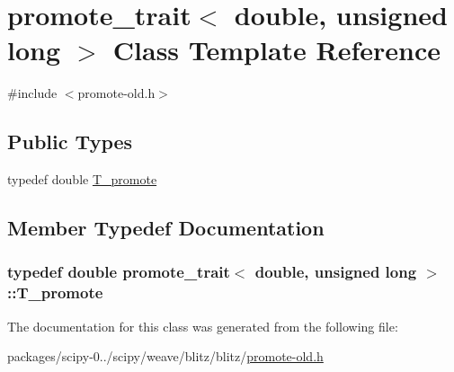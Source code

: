 \hypertarget{classpromote__trait_3_01double_00_01unsigned_01long_01_4}{}\section{promote\+\_\+trait$<$ double, unsigned long $>$ Class Template Reference}
\label{classpromote__trait_3_01double_00_01unsigned_01long_01_4}


{\ttfamily \#include $<$promote-\/old.\+h$>$}

\subsection*{Public Types}
\begin{DoxyCompactItemize}
\item 
typedef double \hyperlink{classpromote__trait_3_01double_00_01unsigned_01long_01_4_a3a031f25728e62f683fcbc26ebf545e0}{T\+\_\+promote}
\end{DoxyCompactItemize}


\subsection{Member Typedef Documentation}
\hypertarget{classpromote__trait_3_01double_00_01unsigned_01long_01_4_a3a031f25728e62f683fcbc26ebf545e0}{}
\subsubsection[{T\+\_\+promote}]{\setlength{\rightskip}{0pt plus 5cm}typedef double {\bf promote\+\_\+trait}$<$ double, unsigned long $>$\+::{\bf T\+\_\+promote}}\label{classpromote__trait_3_01double_00_01unsigned_01long_01_4_a3a031f25728e62f683fcbc26ebf545e0}


The documentation for this class was generated from the following file\+:\begin{DoxyCompactItemize}
\item 
packages/scipy-\/0../scipy/weave/blitz/blitz/\hyperlink{promote-old_8h}{promote-\/old.\+h}\end{DoxyCompactItemize}
